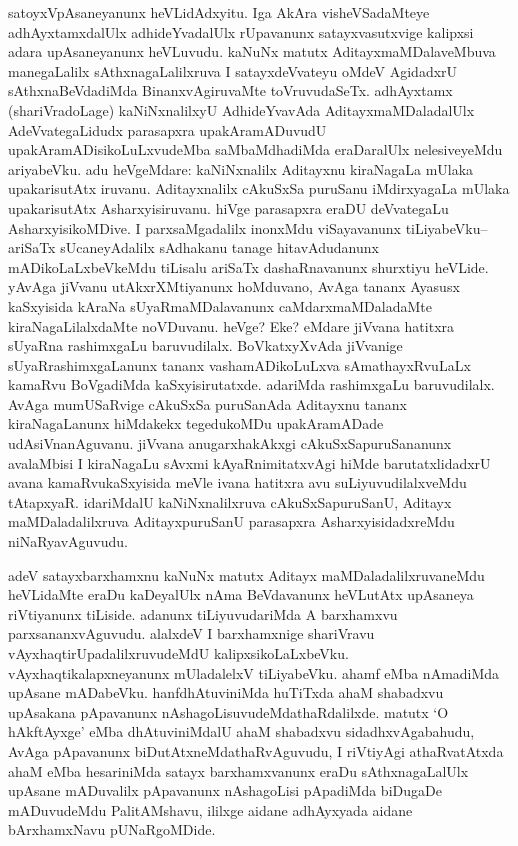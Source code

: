 
\begin{artha}
satoyxVpAsaneyanunx heVLidAdxyitu. Iga AkAra visheVSadaMteye adhAyxtamxdalUlx adhideYvadalUlx rUpavanunx satayxvasutxvige kalipxsi adara upAsaneyanunx heVLuvudu. kaNuNx matutx AditayxmaMDalaveMbuva manegaLalilx sAthxnagaLalilxruva I satayxdeVvateyu oMdeV AgidadxrU sAthxnaBeVdadiMda BinanxvAgiruvaMte toVruvudaSeTx. adhAyxtamx (shariVradoLage) kaNiNxnalilxyU AdhideYvavAda AditayxmaMDaladalUlx  AdeVvategaLidudx parasapxra upakAramADuvudU upakAramADisikoLuLxvudeMba saMbaMdhadiMda eraDaralUlx nelesiveyeMdu ariyabeVku. adu heVgeMdare: kaNiNxnalilx Aditayxnu kiraNagaLa mUlaka upakarisutAtx iruvanu. Aditayxnalilx cAkuSxSa puruSanu iMdirxyagaLa mUlaka upakarisutAtx Asharxyisiruvanu. hiVge parasapxra eraDU deVvategaLu AsharxyisikoMDive. I parxsaMgadalilx inonxMdu viSayavanunx tiLiyabeVku{\rm --} ariSaTx sUcaneyAdalilx sAdhakanu tanage hitavAdudanunx mADikoLaLxbeVkeMdu tiLisalu ariSaTx dashaRnavanunx shurxtiyu heVLide. yAvAga jiVvanu utAkxrXMtiyanunx hoMduvano, AvAga tananx Ayasusx kaSxyisida kAraNa sUyaRmaMDalavanunx caMdarxmaMDaladaMte kiraNagaLilalxdaMte noVDuvanu. heVge? Eke? eMdare jiVvana hatitxra sUyaRna rashimxgaLu baruvudilalx. BoVkatxyXvAda jiVvanige sUyaRrashimxgaLanunx tananx vashamADikoLuLxva sAmathayxRvuLaLx kamaRvu BoVgadiMda kaSxyisirutatxde. adariMda rashimxgaLu baruvudilalx. AvAga mumUSaRvige cAkuSxSa puruSanAda Aditayxnu tananx kiraNagaLanunx hiMdakekx tegedukoMDu upakAramADade udAsiVnanAguvanu. jiVvana anugarxhakAkxgi cAkuSxSapuruSananunx avalaMbisi I kiraNagaLu sAvxmi kAyaRnimitatxvAgi hiMde barutatxlidadxrU avana kamaRvukaSxyisida meVle ivana hatitxra avu suLiyuvudilalxveMdu tAtapxyaR. idariMdalU kaNiNxnalilxruva cAkuSxSapuruSanU, Aditayx maMDaladalilxruva AditayxpuruSanU parasapxra AsharxyisidadxreMdu niNaRyavAguvudu. 
\end{artha}


\begin{artha}
adeV satayxbarxhamxnu kaNuNx matutx Aditayx maMDaladalilxruvaneMdu heVLidaMte eraDu kaDeyalUlx nAma BeVdavanunx heVLutAtx upAsaneya riVtiyanunx tiLiside. adanunx tiLiyuvudariMda A barxhamxvu parxsananxvAguvudu. alalxdeV I barxhamxnige shariVravu vAyxhaqtirUpadalilxruvudeMdU kalipxsikoLaLxbeVku. vAyxhaqtikalapxneyanunx mUladalelxV tiLiyabeVku. a{ha}mf eMba nAmadiMda upAsane mADabeVku. hanfdhAtuviniMda huTiTxda ahaM shabadxvu upAsakana pApavanunx nAshagoLisuvudeMdathaRdalilxde. matutx `O hAkftAyxge' eMba dhAtuviniMdalU ahaM shabadxvu sidadhxvAgabahudu, AvAga pApavanunx biDutAtxneMdathaRvAguvudu, I riVtiyAgi athaRvatAtxda ahaM eMba hesariniMda satayx barxhamxvanunx eraDu sAthxnagaLalUlx upAsane mADuvalilx pApavanunx nAshagoLisi pApadiMda biDugaDe mADuvudeMdu PalitAMshavu, ililxge aidane adhAyxyada aidane bArxhamxNavu pUNaRgoMDide.
\end{artha}

